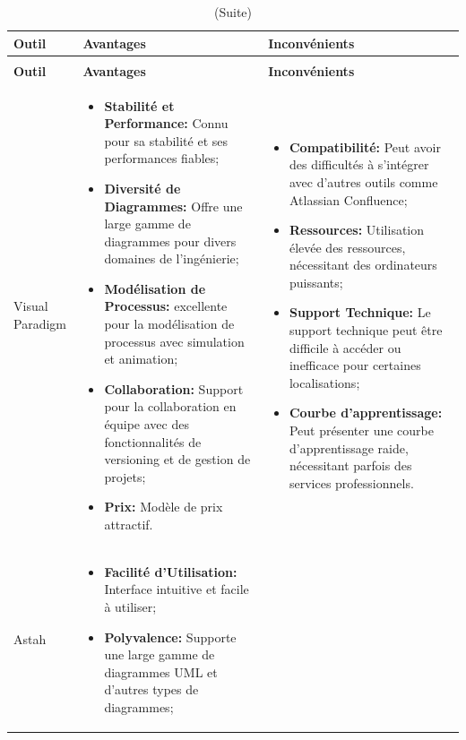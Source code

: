 \documentclass[12pt]{report}
\begin{document}
				\begin{longtable}{|p{3cm}|p{5.5cm}|p{5.5cm}|} 
						\caption{Comparaison  entre Visual Paradigm et Astah.} 
						\label{tab:outilModelisation}\\ 
						\hline 
						\textbf{Outil} & \textbf{Avantages} & \textbf{Inconvénients}\\ 
						\hline 
						\endfirsthead 	
						\caption[]{(Suite)}\\ 
						\hline 
						\textbf{Outil} & \textbf{Avantages} & \textbf{Inconvénients}\\ 
						\hline 
						\endhead
						Visual Paradigm &
						\begin{itemize}
							\item \textbf{Stabilité et Performance:} Connu pour sa stabilité et ses performances fiables;
							\item \textbf{Diversité de Diagrammes:} Offre une large gamme de diagrammes pour divers domaines de l'ingénierie;
							\item \textbf{Modélisation de Processus:} excellente pour la modélisation de processus avec simulation et animation;
							\item \textbf{Collaboration:} Support pour la collaboration en équipe avec des fonctionnalités de versioning et de gestion de projets;
							\item \textbf{Prix:} Modèle de prix attractif.
						\end{itemize} &
						\begin{itemize}
							\item \textbf{Compatibilité:} Peut avoir des difficultés à s'intégrer avec d'autres outils comme Atlassian Confluence;
							\item \textbf{Ressources:} Utilisation élevée des ressources, nécessitant des ordinateurs puissants;
							\item \textbf{Support Technique:} Le support technique peut être difficile à accéder ou inefficace pour certaines localisations;
							\item \textbf{Courbe d'apprentissage:} Peut présenter une courbe d'apprentissage raide, nécessitant parfois des services professionnels.
						\end{itemize}\\
						\hline
						Astah &
						\begin{itemize}
							\item \textbf{Facilité d'Utilisation:} Interface intuitive et facile à utiliser;
							\item \textbf{Polyvalence:} Supporte une large gamme de diagrammes UML et d'autres types de diagrammes;

\end{itemize}
\end{longtable}
\end{document}
